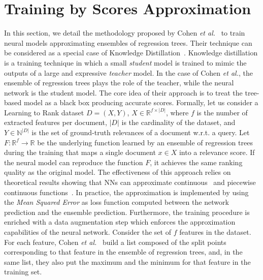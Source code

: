 \section{Training by Scores Approximation}
\label{sec:cohen}
In this section, we detail the methodology proposed by Cohen \textit{et al.}~\cite{cohen2018universal} to train neural models approximating ensembles of regression trees.
Their technique can be considered as a special case of Knowledge Distillation~\cite{ba2014deep,DBLP:journals/corr/HintonVD15}.
Knowledge distillation is a training technique in which a small \emph{student} model is trained to mimic the outputs of a large and expressive \emph{teacher} model.
In the case of Cohen \emph{et al.}, the ensemble of regression trees plays the role of the teacher, while the neural network is the student model.
The core idea of their approach is to treat the tree-based model as a black box producing accurate scores. Formally, let us consider a Learning to Rank dataset $D = (X, Y)$,  $X \in \mathbb{R}^{f \times |D|}$, where $f$ is the number of extracted features per document, $|D|$ is the cardinality of the dataset, and $Y \in \mathbb{N}^{|D|}$ is the set of ground-truth relevances of a document w.r.t. a query.
Let $F: \mathbb{R}^{f} \rightarrow \mathbb{R}$ be the underlying function learned by an ensemble of regression trees during the training that maps a single document $x \in X$ into a relevance score.
If the neural model can reproduce the function $F$, it achieves the same ranking quality as the original model. The effectiveness of this approach relies on theoretical results showing that NNs can approximate continuous~\cite{hornik1991approximation} and piecewise continuous functions~\cite{llanas2008constructive}. In practice, the approximation is implemented by using the \emph{Mean Squared Error} as loss function computed between the network prediction and the ensemble prediction. Furthermore, the training procedure is enriched with a data augmentation step which enforces the approximation capabilities of the neural network. Consider the set of $f$ features in the dataset. For each feature, Cohen \emph{et al.}~\cite{cohen2018universal} build a list composed of 
the split points corresponding to that feature in the ensemble of regression trees, and, in the same list, they also put the maximum and the minimum for that feature in the training set.
